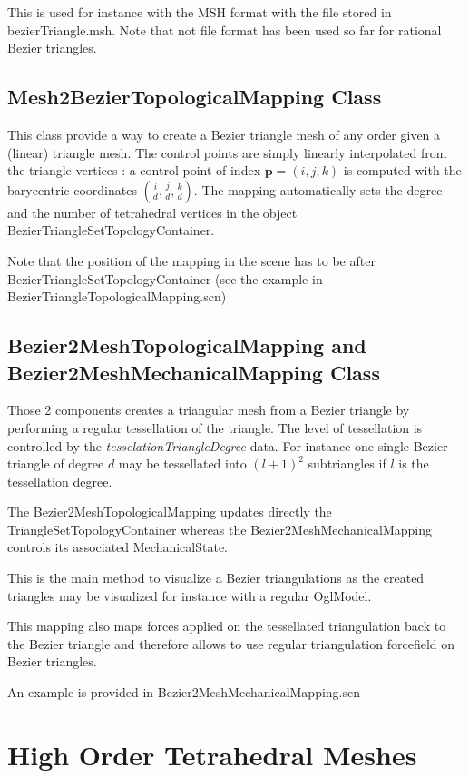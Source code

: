 \documentclass[a4paper,11pt]{article}
\newcommand{\degree}{{d}}
\begin{document}
This is used for instance with the MSH format with the file stored in bezierTriangle.msh. Note that not file format has been used so far for rational Bezier triangles. 

\subsection{Mesh2BezierTopologicalMapping Class}

This class provide a way to create a Bezier triangle mesh of any order given a (linear) triangle mesh. The control points are simply linearly interpolated from the triangle vertices : a control point of index ${\mathbf p}=(i,j,k)$ is computed with the barycentric coordinates $(\frac{i}{\degree},\frac{j}{\degree},\frac{k}{\degree})$. The mapping automatically sets the degree and the number of tetrahedral vertices in the object BezierTriangleSetTopologyContainer.

Note that the position of the mapping in the scene has to be after BezierTriangleSetTopologyContainer (see the example in BezierTriangleTopologicalMapping.scn) 

\subsection{Bezier2MeshTopologicalMapping and Bezier2MeshMechanicalMapping Class}

Those 2 components creates a triangular mesh from a Bezier triangle by performing a regular tessellation of the triangle. The level of tessellation is controlled by the {\em tesselationTriangleDegree } data.  For instance one single Bezier triangle of degree $d$ may be tessellated into $(l+1)^2$ subtriangles if $l$ is the tessellation degree. 

The Bezier2MeshTopologicalMapping updates directly the TriangleSetTopologyContainer whereas the Bezier2MeshMechanicalMapping controls its associated MechanicalState. 

This is the main method to visualize a Bezier triangulations as the created triangles may be visualized for instance with a regular OglModel. 

This mapping also maps forces applied on the tessellated triangulation back to the Bezier triangle and therefore allows to use regular triangulation forcefield on Bezier triangles.

An example is provided in Bezier2MeshMechanicalMapping.scn


\section{High Order Tetrahedral Meshes}
\end{document}
